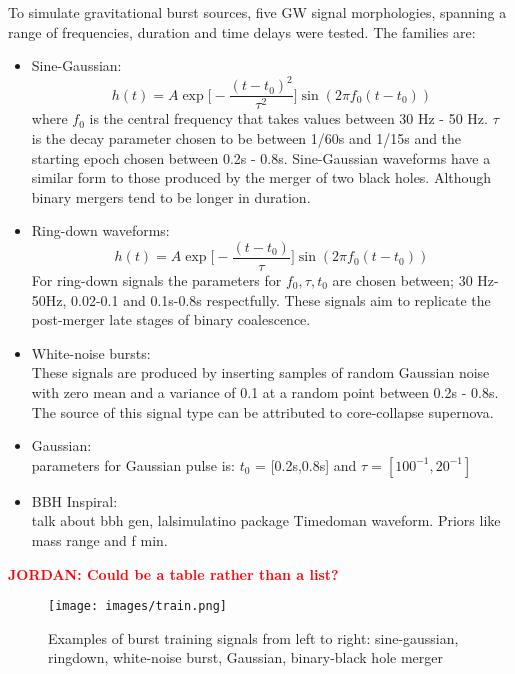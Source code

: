 \documentclass[12pt]{iopart}
\newcommand{\jordan}[1]{\textbf{\textcolor{red}{JORDAN: #1}}}
\begin{document}
To simulate gravitational burst sources, five GW signal morphologies, spanning a range of frequencies, duration and time delays were tested. The families are:
\begin{itemize}
	\item Sine-Gaussian:
		\begin{equation}
		\label{eqn:sg}
			h(t) = A \exp\bigg[ - \frac{(t-t_{0})^2}{\tau^2} \bigg] \sin (2 \pi f_0 (t-t_0))
		\end{equation}	
		where $f_0$ is the central frequency that takes values between 30 Hz - 50 Hz. $\tau$ is the decay parameter chosen to be between 1/60s  and 1/15s and the starting epoch chosen between 0.2s - 0.8s. Sine-Gaussian waveforms have a similar form to those produced by the merger of two black holes. Although binary mergers tend to be longer in duration.  		
	\item Ring-down waveforms:
		\begin{equation}
			h(t) = A \exp \bigg[-\frac{(t-t_0)}{\tau}\bigg]\sin(2 \pi f_0 (t-t_0))
		\end{equation}
		For ring-down signals the parameters for $f_0, \tau, t_0$ are chosen between; 30 Hz-50Hz, 0.02-0.1 and 0.1s-0.8s respectfully. These signals aim to replicate the post-merger late stages of binary coalescence.
	\item White-noise bursts:\hfill \\
	These signals are produced by inserting samples of random Gaussian noise with zero mean and a variance of 0.1 at a random point between 0.2s - 0.8s. The source of this signal type can be attributed to core-collapse supernova. 
	\item Gaussian:\\
	parameters for Gaussian pulse is: $t_0$ = [0.2s,0.8s] and $\tau = [100^{-1},20^{-1}]$
	\item BBH Inspiral: \\
	talk about bbh gen, lalsimulatino package Timedoman waveform. Priors like mass range and f min. 
\end{itemize}
\jordan{Could be a table rather than a list?}
\begin{figure}
    \centering
    \texttt{[image: images/train.png]}
    \caption{Examples of burst training signals from left to right: sine-gaussian, ringdown, white-noise burst, Gaussian, binary-black hole merger}
    \label{fig:my_label}
\end{figure}
\end{document}
